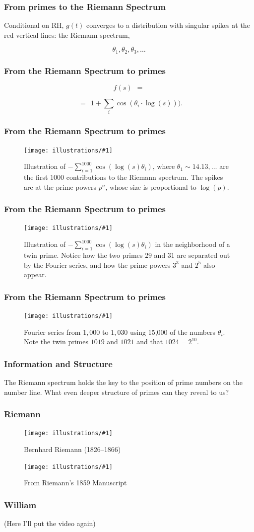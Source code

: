 \documentclass{beamer}
\newcommand{\ill}[3]{%
   \begin{figure}[H]%
   \vspace{-2ex}
   \centering%
   \texttt{[image: illustrations/\#1]}%
   \caption{#3}%
   \vspace{-2ex}
    \end{figure}}
\begin{document}
\begin{frame}\frametitle{\bf From primes to the Riemann Spectrum}
{\Huge  Conditional on RH, $g(t)$ converges to a distribution with singular spikes at the red vertical lines: the Riemann spectrum,

  $$\theta_1, \theta_2, \theta_3,\dots $$}  \end{frame}
  \begin{frame}\frametitle{\bf From  the Riemann Spectrum to primes}
{\Huge

$$f(s)\ \ = $$

$$\ \ = \ \   1+ \sum_{i}\cos(\theta_i\cdot \log(s))).$$}  \end{frame}
  \begin{frame}\frametitle{\bf From  the Riemann Spectrum to primes}
{\Huge



 \ill{phi_cos_sum_2_30_1000}{.8}{Illustration of $-\sum_{i=1}^{1000}
   \cos(\log(s)\theta_i)$, where $\theta_1 \sim 14.13, \ldots$ are the
   first $1000$ contributions to the Riemann spectrum.  The spikes
   are at the prime powers $p^n$, whose size is proportional to
   $\log(p)$.}}  \end{frame}
  \begin{frame}\frametitle{\bf From  the Riemann Spectrum to primes}
{\Huge

 \ill{phi_cos_sum_26_34_1000}{.8}{Illustration of $-\sum_{i=1}^{1000}
   \cos(\log(s)\theta_i)$ in the neighborhood of a twin prime.  Notice
   how the two primes $29$ and $31$ are separated out by the Fourier
   series, and how the prime powers $3^3$ and $2^5$ also appear.}}  \end{frame}
  \begin{frame}\frametitle{\bf From  the Riemann Spectrum to primes}
{\Huge

 \ill{phi_cos_sum_1010_1026_15000}{.7}{Fourier series from $1,000$ to
   $1,030$ using 15,000 of the numbers $\theta_i$.  Note the twin
   primes $1019$ and $1021$ and that $1024=2^{10}$.}}  \end{frame}
\begin{frame}\frametitle{\bf Information  and Structure}

{\Huge The Riemann spectrum holds the key to the position of prime numbers on the number line. What even deeper structure of primes can they reveal to us?}\end{frame}
\begin{frame}
\frametitle{Riemann}
\ill{riemann}{.2}{Bernhard Riemann (1826--1866)}

\ill{riemann_zoom}{1}{From Riemann's 1859 Manuscript\label{fig:riemamn}}
\end{frame}
\begin{frame}
\frametitle{William}
 (Here I'll put the video again)
\end{frame}
\end{document}
